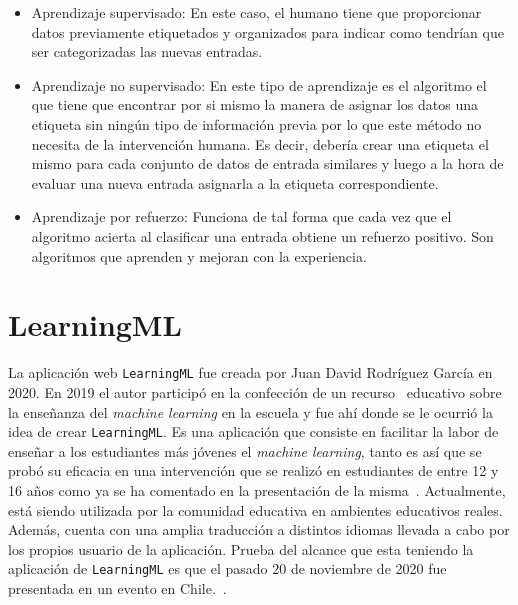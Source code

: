 \documentclass[a4paper, 12pt]{book}
\begin{document}
\begin{itemize}
 
	\item Aprendizaje supervisado: En este caso, el humano tiene que proporcionar datos previamente etiquetados y organizados para indicar como tendrían que ser categorizadas las nuevas entradas.
 
	\item Aprendizaje no supervisado: En este tipo de aprendizaje es el algoritmo el que tiene que encontrar por si mismo la manera de asignar los datos una etiqueta sin ningún tipo de información previa por lo que este método no necesita de la intervención humana. Es decir, debería crear una etiqueta el mismo para cada conjunto de datos de entrada similares y luego a la hora de evaluar una nueva entrada asignarla a la etiqueta correspondiente.

	\item Aprendizaje por refuerzo: Funciona de tal forma que cada vez que el algoritmo acierta al clasificar una entrada obtiene un refuerzo positivo. Son algoritmos que aprenden y mejoran con la experiencia.

\end{itemize}


\section{LearningML} 
\label{sec:learningml}

La aplicación web \texttt{LearningML} fue creada por Juan David Rodríguez García en 2020. En 2019 el autor participó en la confección de un recurso~\cite{recursoeducativo} educativo sobre la enseñanza del \emph{machine learning} en la escuela y fue ahí donde se le ocurrió la idea de crear \texttt{LearningML}. Es una aplicación que consiste en facilitar la labor de enseñar a los estudiantes más jóvenes el \emph{machine learning}, tanto es así que se probó su eficacia en una intervención que se realizó en estudiantes de entre 12 y 16 años como ya se ha comentado en la presentación de la misma~\cite{rodriguez2021evaluation}. Actualmente, está siendo utilizada por la comunidad educativa en ambientes educativos reales. Además, cuenta con una amplia traducción a distintos idiomas llevada a cabo por los propios usuario de la aplicación. Prueba del alcance que esta teniendo la aplicación de \texttt{LearningML} es que el pasado 20 de noviembre de 2020 fue presentada en un evento en Chile.~\cite{lmllatinoamerica}.
\end{document}
